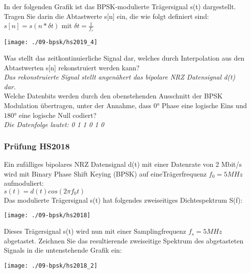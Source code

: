 In der folgenden Grafik ist das BPSK-modulierte Trägersignal s(t) dargestellt. Tragen Sie darin die Abtastwerte s[n] ein, die wie folgt definiert sind:\\
$s[n]=s(n*\delta t)$ mit $\delta t = \frac{1}{f_s}$
\begin{center}
    \vspace{-8pt}
    \texttt{[image: ./09-bpsk/hs2019\_4]}
    \vspace{-8pt}
\end{center}

Was stellt das zeitkontinuierliche Signal dar, welches durch Interpolation aus den Abtastwerten s[n] rekonstruiert werden kann?\\
\textit{Das rekonstruierte Signal stellt angenähert das bipolare NRZ Datensignal d(t) dar.}\\

Welche Datenbits werden durch den obenstehenden Ausschnitt der BPSK Modulation übertragen, unter der Annahme, dass $0°$ Phase eine logische Eins und $180°$ eine logische
Null codiert?\\
\textit{Die Datenfolge lautet: 0 1 1 0 1 0}

\subsubsection{Prüfung HS2018}
Ein zufälliges bipolares NRZ Datensignal d(t) mit einer Datenrate von 2 Mbit/s wird mit Binary Phase Shift Keying (BPSK) auf eineTrägerfrequenz $f_0 = 5 MHz$ aufmoduliert:\\
$s(t)=d(t)cos(2\pi f_0t)$\\
Das modulierte Trägersignal s(t) hat folgendes zweiseitiges Dichtespektrum S(f):
\begin{center}
    \vspace{-8pt}
    \texttt{[image: ./09-bpsk/hs2018]}
    \vspace{-8pt}
\end{center}

Dieses Trägersignal s(t) wird nun mit einer Samplingfrequenz $f_s = 5 MHz$ abgetastet. Zeichnen Sie das resultierende zweiseitige Spektrum des abgetasteten Signals in die
untenstehende Grafik ein:
\begin{center}
    \vspace{-8pt}
    \texttt{[image: ./09-bpsk/hs2018\_2]}
    \vspace{-8pt}
\end{center}

